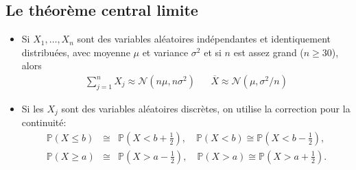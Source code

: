\documentclass[12pt,french]{article}
\begin{document}
%
%
%




\subsection*{Le théorème central limite}

\vspace{0.1in}
\begin{itemize}
\item
Si $X_1,\hdots, X_n$ sont des variables aléatoires
indépendantes et identiquement distribuées, avec moyenne $\mu$
et variance $\sigma^2$ et si $n$ est assez grand
($n\ge  30$), alors
\vspace{-0.2cm}
\begin{align*}
    \sum\limits_{j=1}^n X_j\approx \mathcal{N}(n\mu, n\sigma^2) & & \overline{X}\approx \mathcal{N}(\mu,\sigma^2/n)
\end{align*}

\item
Si les $X_j$ sont des variables aléatoires
discrètes, on utilise la correction pour la continuité:
\begin{eqnarray*}
\mathbb{P}(X \leq b) &\cong& \mathbb{P}\left(X < b+\frac12\right), \quad {\mathbb
P}(X < b) \cong \mathbb{P}\left(X < b - \frac12\right), \\ \mathbb{P}(X \geq a) &\cong& \mathbb{P}\left(X
> a-\frac12\right), \quad \mathbb{P}(X > a) \cong \mathbb{P}\left(X > a+\frac12\right).
\end{eqnarray*}
\end{itemize}
\end{document}

